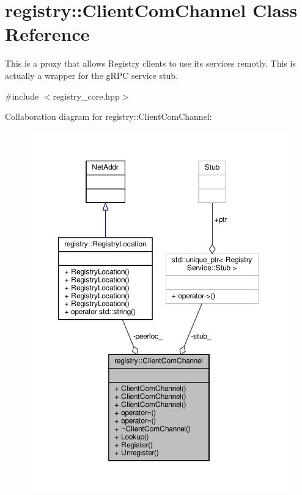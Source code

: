 \hypertarget{classregistry_1_1ClientComChannel}{}\section{registry\+:\+:Client\+Com\+Channel Class Reference}
\label{classregistry_1_1ClientComChannel}


This is a proxy that allows Registry clients to use its services remotly. This is actually a wrapper for the g\+R\+PC service stub.  




{\ttfamily \#include $<$registry\+\_\+core.\+hpp$>$}



Collaboration diagram for registry\+:\+:Client\+Com\+Channel\+:\nopagebreak
\begin{figure}[H]
\begin{center}
\leavevmode
\includegraphics[width=350pt]{classregistry_1_1ClientComChannel__coll__graph}
\end{center}
\end{figure}
